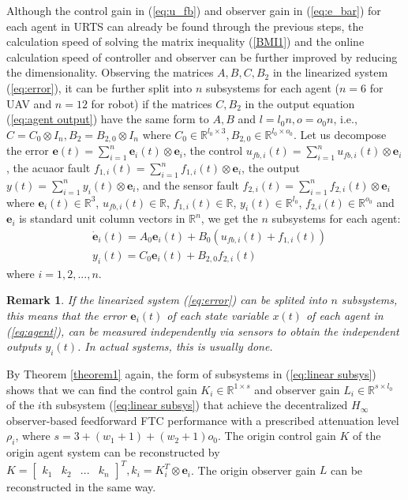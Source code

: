 \documentclass{ieeeaccess}
\newtheorem{remark}{Remark}
\begin{document}
Although the control gain in (\ref{eq:u_fb}) and observer gain in (\ref{eq:e_bar}) for each agent in URTS can already be found through the previous steps, the calculation speed of solving the matrix inequality (\ref{BMI1}) and the online calculation speed of controller and observer can be further improved by reducing the dimensionality. Observing the matrices $A,B,C,B_2$ in the linearized system (\ref{eq:error}), it can be further split into $n$ subsystems for each agent ($n=6$ for UAV and $n=12$ for robot) if the matrices $C,B_2$ in the output equation (\ref{eq:agent output}) have the same form to $A,B$ and $l=l_0n, o=o_0n$, i.e., $C = C_0\otimes I_n,B_2 = B_{2,0}\otimes I_n$ where $C_0\in\mathbb{R}^{l_0\times 3},B_{2,0}\in\mathbb{R}^{l_0\times o_0}$. Let us decompose 
the error $\pmb{e}(t)=\sum_{i=1}^{n} \pmb{e}_i(t)\otimes\mathbf{e}_i$, 
the control $u_{fb,i}(t)=\sum_{i=1}^{n} {u}_{fb,i}(t)\otimes\mathbf{e}_i$, 
the acuaor fault $f_{1,i}(t)=\sum_{i=1}^{n} {f}_{1,i}(t)\otimes\mathbf{e}_i$, 
the output $y(t)=\sum_{i=1}^{n} {y}_i(t)\otimes\mathbf{e}_i$, 
and the sensor fault $f_{2,i}(t)=\sum_{i=1}^{n} {f}_{2,i}(t)\otimes\mathbf{e}_i$ 
where $\pmb{e}_i(t)\in\mathbb{R}^3$, $u_{fb,i}(t)\in\mathbb{R}$, $f_{1,i}(t)\in\mathbb{R}$, $y_i(t)\in\mathbb{R}^{l_0}$, $f_{2,i}(t)\in\mathbb{R}^{o_0}$ and $\mathbf{e}_i$ is standard unit column vectors in $\mathbb{R}^n$, we get the $n$ subsystems for each agent:
\begin{equation} \label{eq:linear subsys}
    \begin{split}
        & \dot{\pmb{e}}_i(t)=A_0\pmb{e}_i(t)+B_0(u_{fb,i}(t)+f_{1,i}(t)) \\
        & {y}_i(t)=C_0\pmb{e}_i(t)+B_{2,0}f_{2,i}(t)   
    \end{split}
\end{equation} where $i=1,2,...,n$.
\begin{remark}
    If the linearized system (\ref{eq:error}) can be splited into $n$ subsystems, this means that the error $\pmb{e}_i(t)$ of each state variable $x(t)$ of each agent in (\ref{eq:agent}), can be measured independently via sensors to obtain the independent outputs $y_i(t)$. In actual systems, this is usually done.
\end{remark}

By Theorem \ref{theorem1} again, the form of subsystems in (\ref{eq:linear subsys}) shows that we can find the control gain $K_i\in\mathbb{R}^{1\times s}$ and observer gain $L_i\in\mathbb{R}^{s\times l_0}$ of the $i$th subsystem (\ref{eq:linear subsys}) that achieve the decentralized $H_\infty$ observer-based feedforward FTC performance with a prescribed attenuation level $\rho_i$, where $s=3+(w_1+1)+(w_2+1)o_0$. The origin control gain $K$ of the origin agent system can be reconstructed by $K = \begin{bmatrix}
    \mathit{k}_1 & \mathit{k}_2 & ... & \mathit{k}_n
\end{bmatrix}^T, \mathit{k}_i=K_i^T\otimes\mathbf{e}_i$. The origin observer gain $L$ can be reconstructed in the same way. 
\end{document}
